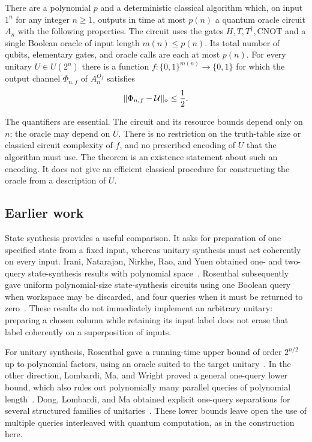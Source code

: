 \begin{theorem}\label{thm:main}
There are a polynomial $p$ and a deterministic classical algorithm which, on
input $1^n$ for any integer $n\ge1$, outputs in time at most $p(n)$ a quantum
oracle circuit $A_n$ with the following properties.  The circuit uses the gates
$H,T,T^\dagger,\mathrm{CNOT}$ and a single Boolean oracle of input length
$m(n)\le p(n)$.  Its total number of qubits, elementary gates, and oracle calls
are each at most $p(n)$.  For every unitary $U\in U(2^n)$ there is a function
$f:\{0,1\}^{m(n)}\to\{0,1\}$ for which the output channel $\Phi_{n,f}$ of
$A_n^{O_f}$ satisfies
\[
 \lVert \Phi_{n,f}-\mathcal U\rVert_\diamond\le\frac12.
\]
\end{theorem}

The quantifiers are essential.  The circuit and its resource bounds depend
only on $n$; the oracle may depend on $U$.  There is no restriction on the
truth-table size or classical circuit complexity of $f$, and no prescribed
encoding of $U$ that the algorithm must use.  The theorem is an existence
statement about such an encoding.  It does not give an efficient classical
procedure for constructing the oracle from a description of $U$.

\subsection{Earlier work}
State synthesis provides a useful comparison.  It asks for preparation of one
specified state from a fixed input, whereas unitary synthesis must act
coherently on every input.  Irani, Natarajan, Nirkhe, Rao, and Yuen obtained
one- and two-query state-synthesis results with polynomial
space~\cite{INNRY2022}.  Rosenthal subsequently gave uniform polynomial-size
state-synthesis circuits using one Boolean query when workspace may be
discarded, and four queries when it must be returned to
zero~\cite{Rosenthal2024}.  These results do not immediately implement an
arbitrary unitary: preparing a chosen column while retaining its input label
does not erase that label coherently on a superposition of inputs.

For unitary synthesis, Rosenthal gave a running-time upper bound of order
$2^{n/2}$ up to polynomial factors, using an oracle suited to the target
unitary~\cite{Rosenthal2026}.  In the other direction, Lombardi, Ma, and Wright
proved a general one-query lower bound, which also rules out polynomially
many parallel queries of polynomial length~\cite{LMW2024}.  Dong, Lombardi,
and Ma obtained explicit one-query separations for several structured
families of unitaries~\cite{DLM2026}.  These lower bounds leave open the use of
multiple queries interleaved with quantum computation, as in the construction
here.

